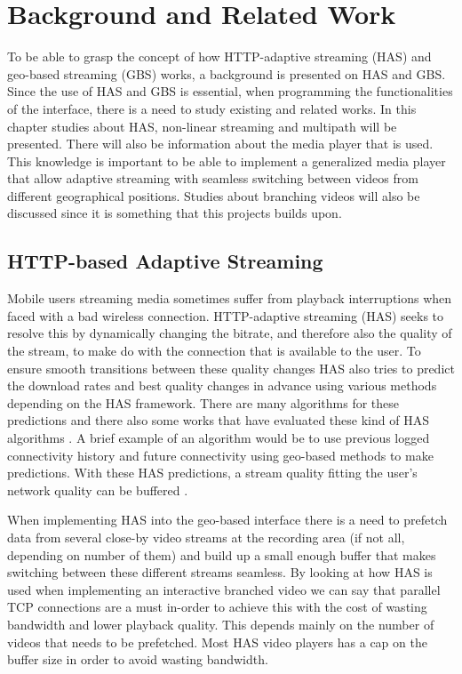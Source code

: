 \chapter{Background and Related Work}
\label{cha:theory}

To be able to grasp the concept of how HTTP-adaptive streaming (HAS) and geo-based streaming (GBS) works, a background is presented on HAS and GBS. Since the use of HAS and GBS is essential, when programming the functionalities of the interface, there is a need to study existing and related works. In this chapter studies about HAS, non-linear streaming and multipath will be presented. There will also be information about the media player that is used. This knowledge is important to be able to implement a generalized media player that allow adaptive streaming with seamless switching between videos from different geographical positions. Studies about branching videos will also be discussed since it is something that this projects builds upon.

\section{HTTP-based Adaptive Streaming}
\label{sec:has}

Mobile users streaming media sometimes suffer from playback interruptions when faced with a bad wireless connection. HTTP-adaptive streaming (HAS) seeks to resolve this by dynamically changing the bitrate, and therefore also the quality of the stream, to make do with the connection that is available to the user. To ensure smooth transitions between these quality changes HAS also tries to predict the download rates and best quality changes in advance using various methods depending on the HAS framework. There are many algorithms for these predictions and there also some works that have evaluated these kind of HAS algorithms \cite{whathappens,hastohelp}. A brief example of an algorithm would be to use previous logged connectivity history and future connectivity using geo-based methods to make predictions. With these HAS predictions, a stream quality fitting the user’s network quality can be buffered \cite{gtube}.

When implementing HAS into the geo-based interface there is a need to prefetch data from several close-by video streams at the recording area (if not all, depending on number of them) and build up a small enough buffer that makes switching between these different streams seamless. By looking at how HAS is used when implementing an interactive branched video we can say that parallel TCP connections are a must in-order to achieve this with the cost of wasting bandwidth and lower playback quality. This depends mainly on the number of videos that needs to be prefetched. Most HAS video players has a cap on the buffer size in order to avoid wasting bandwidth. 

